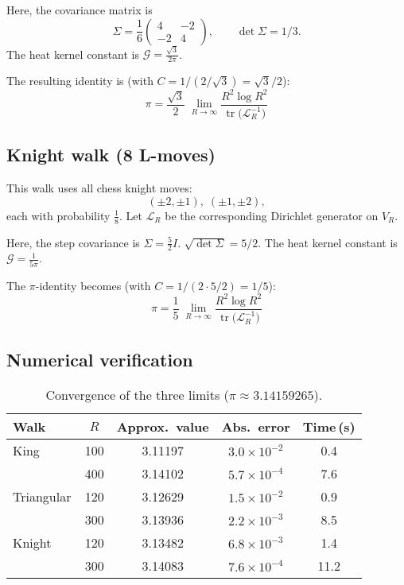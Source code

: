 \documentclass[12pt]{amsart}
\theoremstyle{definition}
\theoremstyle{remark}
\newcommand{\cG}{\mathcal{G}}    %
\DeclareMathOperator{\tr}{tr}    %
\begin{document}
Here, the covariance matrix is
\[
\Sigma
=\frac{1}{6}
\begin{pmatrix}
4 & -2 \\
-2 & 4
\end{pmatrix},
\qquad
\det\Sigma = 1/3.
\]
The heat kernel constant is $\cG = \frac{\sqrt{3}}{2\pi}$.

The resulting identity is (with $C = 1/(2/\sqrt{3}) = \sqrt{3}/2$):
\begin{equation}\label{eq:Tri_pi}
\boxed{\;
\displaystyle
\pi
=\frac{\sqrt{3}}{2}\;
   \lim_{R\to\infty}
          \frac{R^{2}\log R^{2}}
               {\tr\!\bigl(\mathcal{L}_R^{-1}\bigr)}
   \;}
\end{equation}


\subsection{Knight walk (8 L-moves)}\label{app:knight}

This walk uses all chess knight moves:
\[
(\pm2,\pm1),\;(\pm1,\pm2),
\]
each with probability \( \tfrac{1}{8} \). Let $\mathcal{L}_R$ be the corresponding Dirichlet generator on $V_R$.

Here, the step covariance is \( \Sigma = \tfrac{5}{2} I \). $\sqrt{\det\Sigma} = 5/2$.
The heat kernel constant is $\cG = \frac{1}{5\pi}$.

The $\pi$-identity becomes (with $C = 1/(2 \cdot 5/2) = 1/5$):
\begin{equation}\label{eq:Knight_pi}
\boxed{\;
\displaystyle
\pi
=\frac{1}{5}\;
   \lim_{R\to\infty}
          \frac{R^{2}\log R^{2}}
               {\tr\!\bigl(\mathcal{L}_R^{-1}\bigr)}
   \;}
\end{equation}


\subsection{Numerical verification}\label{app:numerical}

\begin{table}[h]
\centering
\caption{Convergence of the three limits ($\pi\approx3.14159265$).}
\label{tab:numeric_pi}
\begin{tabular}{@{}lcccc@{}}
\toprule
Walk & $R$ & Approx.\ value & Abs.\ error & Time\,(s)\\
\midrule
King & 100 & 3.11197 & $3.0\times10^{-2}$ & 0.4 \\
     & 400 & 3.14102 & $5.7\times10^{-4}$ & 7.6 \\
\addlinespace
Triangular & 120 & 3.12629 & $1.5\times10^{-2}$ & 0.9 \\
           & 300 & 3.13936 & $2.2\times10^{-3}$ & 8.5 \\
\addlinespace
Knight & 120 & 3.13482 & $6.8\times10^{-3}$ & 1.4 \\
       & 300 & 3.14083 & $7.6\times10^{-4}$ & 11.2 \\
\bottomrule
\end{tabular}
\end{table}
\end{document}
